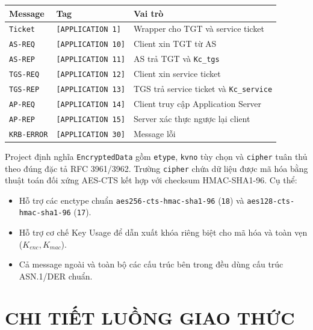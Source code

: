 \documentclass[12pt]{article}
\begin{document}
\begin{table}[H]
\centering
\renewcommand{\arraystretch}{1.25}
\begin{tabularx}{\textwidth}{|p{4cm}|p{4cm}|X|}
\hline
\textbf{Message} & \textbf{Tag} & \textbf{Vai trò} \\
\hline
\texttt{Ticket} & \texttt{[APPLICATION 1]} & Wrapper cho TGT và service ticket \\
\hline
\texttt{AS-REQ} & \texttt{[APPLICATION 10]} & Client xin TGT từ AS \\
\hline
\texttt{AS-REP} & \texttt{[APPLICATION 11]} & AS trả TGT và \texttt{Kc\_tgs} \\
\hline
\texttt{TGS-REQ} & \texttt{[APPLICATION 12]} & Client xin service ticket \\
\hline
\texttt{TGS-REP} & \texttt{[APPLICATION 13]} & TGS trả service ticket và \texttt{Kc\_service} \\
\hline
\texttt{AP-REQ} & \texttt{[APPLICATION 14]} & Client truy cập Application Server \\
\hline
\texttt{AP-REP} & \texttt{[APPLICATION 15]} & Server xác thực ngược lại client \\
\hline
\texttt{KRB-ERROR} & \texttt{[APPLICATION 30]} & Message lỗi \\
\hline
\end{tabularx}
\end{table}

Project định nghĩa \texttt{EncryptedData} gồm \texttt{etype}, \texttt{kvno} tùy chọn và \texttt{cipher} tuân thủ theo đúng đặc tả RFC 3961/3962. Trường \texttt{cipher} chứa dữ liệu được mã hóa bằng thuật toán đối xứng AES-CTS kết hợp với checksum HMAC-SHA1-96. Cụ thể:
\begin{itemize}
    \item Hỗ trợ các enctype chuẩn \texttt{aes256-cts-hmac-sha1-96} (\texttt{18}) và \texttt{aes128-cts-hmac-sha1-96} (\texttt{17}).
    \item Hỗ trợ cơ chế Key Usage để dẫn xuất khóa riêng biệt cho mã hóa và toàn vẹn ($K_{enc}, K_{mac}$).
    \item Cả message ngoài và toàn bộ các cấu trúc bên trong đều dùng cấu trúc ASN.1/DER chuẩn.
\end{itemize}

\section{CHI TIẾT LUỒNG GIAO THỨC}
\end{document}
